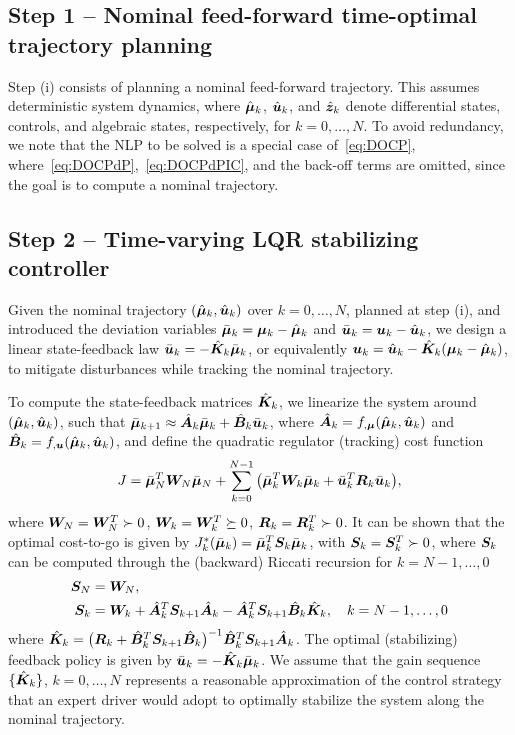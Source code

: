\subsection{Step 1 -- Nominal feed-forward time-optimal trajectory planning}
\label{sec:nominalFF}
Step (i) consists of planning a nominal feed-forward trajectory. This assumes deterministic system dynamics, where $\hat{\boldsymbol{\mu}}_k$, $\hat{\boldsymbol{u}}_k$, and $\hat{\boldsymbol{z}}_k$ denote differential states, controls, and algebraic states, respectively, for \( k = 0, \ldots, N \). To avoid redundancy, we note that the NLP to be solved is a special case of~\eqref{eq:DOCP}, where~\eqref{eq:DOCPdP},~\eqref{eq:DOCPdPIC}, and the back-off terms are omitted, since the goal is to compute a nominal trajectory.

\subsection{Step 2 -- Time-varying LQR stabilizing controller}
\label{sec:LQR}

Given the nominal trajectory $(\hat{\boldsymbol{\mu}}_k, \hat{\boldsymbol{u}}_k)$ over $k=0,\ldots, N$, planned at step (i), and introduced the deviation variables $\bar{\boldsymbol{\mu}}_k=\boldsymbol{\mu}_k - \hat{\boldsymbol{\mu}}_k$ and $\bar{\boldsymbol{u}}_k = \boldsymbol{u}_k - \hat{\boldsymbol{u}}_k$, we design a linear state-feedback law $\bar{\boldsymbol{u}}_k= -\hat{\boldsymbol{K}}_k \bar{\boldsymbol{\mu}}_k$, or equivalently $\boldsymbol{u}_k = \hat{\boldsymbol{u}}_k - \hat{\boldsymbol{K}}_k (\boldsymbol{\mu}_k - \hat{\boldsymbol{\mu}}_k)$, to mitigate disturbances while tracking the nominal trajectory.

To compute the state-feedback matrices $\hat{\boldsymbol{K}}_k$, we linearize the system around $(\hat{\boldsymbol{\mu}}_k, \hat{\boldsymbol{u}}_k)$, such that $\bar{\boldsymbol{\mu}}_{k+1} \approx \hat{\boldsymbol{A}}_{k}\bar{\boldsymbol{\mu}}_k + \hat{\boldsymbol{B}}_k \bar{\boldsymbol{u}}_k$, where $\hat{\boldsymbol{A}}_k = f_{,\boldsymbol{\mu}}(\hat{\boldsymbol{\mu}}_k,\hat{\boldsymbol{u}}_k)$ and $\hat{\boldsymbol{B}}_k = f_{,\boldsymbol{u}}(\hat{\boldsymbol{\mu}}_k,\hat{\boldsymbol{u}}_k)$, and define the quadratic regulator (tracking) cost function
\begin{align}
J = \bar{\boldsymbol{\mu}}_N^T \boldsymbol{W}_N \bar{\boldsymbol{\mu}}_N + \sum_{k=0}^{N-1} \big( \bar{\boldsymbol{\mu}}_k^{T} \boldsymbol{W}_k \bar{\boldsymbol{\mu}}_k + \bar{\boldsymbol{u}}_k^T \boldsymbol{R}_k \bar{\boldsymbol{u}}_k \big),
\end{align}
where $\boldsymbol{W}_N=\boldsymbol{W}_N^T \succ 0$, $\boldsymbol{W}_k=\boldsymbol{W}_k^T \succeq 0$, $\boldsymbol{R}_k=\boldsymbol{R}_k^T \succ 0$. It can be shown that the optimal cost-to-go is given by $J_k^*(\bar{\boldsymbol{\mu}}_k) = \bar{\boldsymbol{\mu}}_k^T \boldsymbol{S}_k \bar{\boldsymbol{\mu}}_k$, with $\boldsymbol{S}_k = \boldsymbol{S}_k^T \succ 0$, where $\boldsymbol{S}_k$ can be computed through the (backward) Riccati recursion for $k=N-1,\ldots, 0$
\begin{align}
\boldsymbol{S}_N &= \boldsymbol{W}_N,\\
\boldsymbol{S}_{k} &= \boldsymbol{W}_k + \hat{\boldsymbol{A}}_k^T \boldsymbol{S}_{k+1} \hat{\boldsymbol{A}}_k - \hat{\boldsymbol{A}}_k^T \boldsymbol{S}_{k+1}\hat{\boldsymbol{B}}_k \hat{\boldsymbol{K}}_k,\quad k={N-1, \ldots, 0}
\end{align}
where  $\hat{\boldsymbol{K}}_k =\big( \boldsymbol{R}_k+\hat{\boldsymbol{B}}_k^T \boldsymbol{S}_{k+1} \hat{\boldsymbol{B}}_k \big)^{-1} \hat{\boldsymbol{B}}_k^T \boldsymbol{S}_{k+1} \hat{\boldsymbol{A}}_k$. The optimal (stabilizing) feedback policy is given by $\bar{\boldsymbol{u}}_k=-\hat{\boldsymbol{K}}_k \bar{\boldsymbol{\mu}}_k$. We assume that the gain sequence $\{\hat{\boldsymbol{K}}_k\}$, $k=0,\ldots, N$ represents a reasonable approximation of the control strategy that an expert driver would adopt to optimally stabilize the system along the nominal trajectory.

